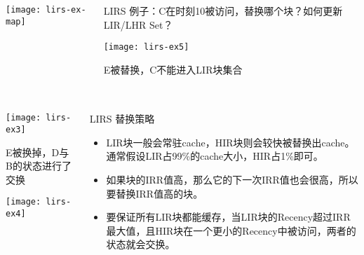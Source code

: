 \begin{frame}[plain]
	\frametitle{ }
	\begin{columns}
		\begin{column}{.4\textwidth}
			\centering
			\texttt{[image: lirs-ex-map]}
		\end{column}
		
		\begin{column}{.6\textwidth}
			LIRS 例子：C在时刻10被访问，替换哪个块？如何更新LIR/LHR Set？
			
			\texttt{[image: lirs-ex5]}
			
			\pause
			\centering
			E被替换，C不能进入LIR块集合 
		\end{column}
		
		
	\end{columns}
\end{frame}


\begin{frame}[plain]
	\frametitle{ }
	\begin{columns}
		\begin{column}{.5\textwidth}
			\centering
			\texttt{[image: lirs-ex3]}
			
			E被换掉，D与B的状态进行了交换 
			
			\texttt{[image: lirs-ex4]}
		\end{column}
		
		\begin{column}{.5\textwidth}
			LIRS 替换策略
			
			\begin{itemize}

				\item  LIR块一般会常驻cache，HIR块则会较快被替换出cache。通常假设LIR占99\%的cache大小，HIR占1\%即可。 
				\item 如果块的IRR值高，那么它的下一次IRR值也会很高，所以要替换IRR值高的块。
				\item 要保证所有LIR块都能缓存，当LIR块的Recency超过IRR最大值，且HIR块在一个更小的Recency中被访问，两者的状态就会交换。
				
				
			\end{itemize}
			
		\end{column}
		
		
	\end{columns}
\end{frame}




